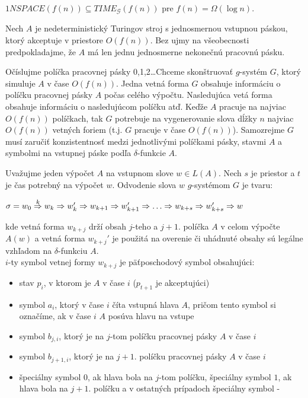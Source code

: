 \begin{lema}
  $1NSPACE(f(n))\subseteq TIME_{\mathcal{G}}(f(n))$ pre $f(n)=\Omega
  (\log n)$.
\end{lema}

\begin{dokaz}
  Nech $A$ je nedeterministický Turingov stroj s jednosmernou
  vstupnou páskou, ktorý akceptuje v priestore $O(f(n))$. Bez ujmy
  na všeobecnosti predpokladajme, že $A$ má len jednu jednosmerne
  nekonečnú pracovnú pásku.

  Očíslujme políčka pracovnej pásky 0,1,2\dots Chceme skonštruovať
  $g$-systém $G$, ktorý simuluje $A$ v čase $O(f(n))$. Jedna vetná
  forma $G$ obsahuje informáciu o políčku pracovnej pásky $A$ počas
  celého výpočtu. Nasledujúca vetá forma obsahuje informáciu o
  nasledujúcom políčku atď. Keďže $A$ pracuje na najviac $O(f(n))$
  políčkach, tak $G$ potrebuje na vygenerovanie slova dĺžky $n$
  najviac $O(f(n))$ vetných foriem (t.j. $G$ pracuje v čase
  $O(f(n))$). Samozrejme $G$ musí zaručiť konzistentnosť medzi
  jednotlivými políčkami pásky, stavmi $A$ a symbolmi na vstupnej
  páske podľa $\delta$-funkcie $A$.

  Uvažujme jeden výpočet $A$ na vstupnom slove $w\in L(A)$. Nech $s$
  je priestor a $t$ je čas potrebný na výpočet $w$. Odvodenie slova
  $w$ $g$-systémom $G$ je tvaru:

  \centerline{$\sigma =w_0\overset{k}\Ra w_k\Ra w_k'\Ra w_{k+1}\Ra
  w_{k+1}'\Ra\dots\Ra w_{k+s}\Ra w_{k+s}'\Ra w$} kde vetná forma
  $w_{k+j}$ drží obsah $j$-teho a $j+1$. políčka $A$ v celom výpočte
  $A(w)$ a vetná forma $w_{k+j}'$ je použitá na overenie či uhádnuté
  obsahy sú legálne vzhľadom na $\delta$-funkciu $A$.\\ $i$-ty
  symbol vetnej formy $w_{k+j}$ je päťposchodový symbol obsahujúci:

  \begin{itemize}
    \item stav $p_i$, v ktorom je $A$ v čase $i$ ($p_{t+1}$ je akceptujúci)
    \item symbol $a_i$, ktorý v čase $i$ číta vstupná hlava $A$, pričom tento symbol si
    označíme, ak v čase $i$ $A$ posúva hlavu na vstupe
    \item symbol $b_{j,i}$, ktorý je na $j$-tom políčku pracovnej pásky $A$ v čase $i$
    \item symbol $b_{j+1,i}$, ktorý je na $j+1$. políčku pracovnej pásky $A$ v čase $i$
    \item špeciálny symbol $0$, ak hlava bola na $j$-tom políčku, špeciálny symbol $1$, ak
    hlava bola na $j+1$. políčku a v ostatných prípadoch špeciálny
    symbol -
  \end{itemize}


\end{dokaz}
